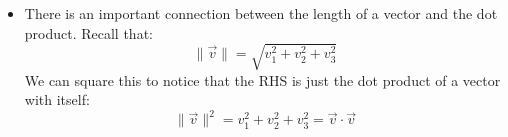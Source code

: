 \begin{itemize}
\begin{itemize}
\begin{prooof}
\begin{align}
\begin{bmatrix}
                    w_1\\w_2\\w_3
                \end{bmatrix}+\begin{bmatrix}
                    z_1\\z_2\\z_3
                \end{bmatrix}\right) \\ 
                &= \begin{bmatrix}
                    v_1\\v_2\\v_3
                \end{bmatrix} \cdot \begin{bmatrix}
                    w_1+z_1\\w_2+z_2\\w_3+z_3
                \end{bmatrix} \\ 
                &=
                \begin{bmatrix}
                    v_1(w_1+z_1) \\ 
                    v_2(w_2+z_2) \\ 
                    v_3(w_3+z_2) \\ 
                \end{bmatrix} \\ 
                &= \vec{v}\cdot\vec{w}+\vec{v}\cdot\vec{z}
                \label{eq:}
            \end{align}
        \end{prooof}
        \item The commutative property: $\vec{v}\cdot\vec{w} = \vec{w}\cdot\vec{v}$.
        \item Associative: $c(\vec{v}\cdot\vec{w})=(c\vec{v})\cdot\vec{w}=\vec{v}\cdot(c\vec{w})$
    \end{itemize}
    \item There is an important connection between the length of a vector and the dot product. Recall that:
    \begin{equation}
        \lVert \vec{v} \rVert = \sqrt{v_1^2+v_2^2+v_3^2}
        \label{eq:}
    \end{equation}
    We can square this to notice that the RHS is just the dot product of a vector with itself:
    \begin{equation}
        \lVert \vec{v} \rVert^2 = v_1^2+v_2^2+v_3^2 = \vec{v}\cdot\vec{v}
        \label{eq:}

\end{equation}
\end{itemize}
